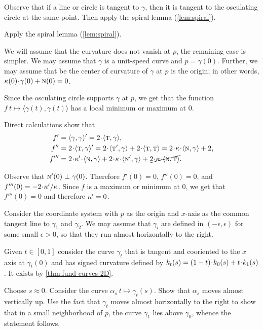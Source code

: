 Observe that if a line or circle is tangent to $\gamma$,
then it is tangent to the osculating circle at the same point.
Then apply the spiral lemma (\ref{lem:spiral}).

\setcounter{eqtn}{0}

Apply the spiral lemma (\ref{lem:spiral}).

We will assume that the curvature does not vanish at $p$, the remaining case is simpler.
We may assume that $\gamma$ is a unit-speed curve and $p=\gamma(0)$.
Further, we may assume that be the center of curvature of $\gamma$ at $p$ is the origin;
in other words, $\kur(0)\cdot\gamma(0)+ \norm(0)=0$.

Since the osculating circle supports $\gamma$ at $p$,
we get that the function $f\:t\mapsto \langle\gamma(t),\gamma(t)\rangle$ has a local minimum or maximum at $0$.

Direct calculations show that 
\begin{align*}
f'
&=\langle\gamma,\gamma\rangle'
=2\cdot\langle\tan,\gamma\rangle,
\\
f''
&=2\cdot\langle\tan,\gamma\rangle'
=2\cdot\langle\tan',\gamma\rangle+2\cdot\langle\tan,\tan\rangle
=2\cdot\kur\cdot\langle\norm,\gamma\rangle+2,
\\
f'''
&=2\cdot\kur'\cdot\langle\norm,\gamma\rangle
+2\cdot\kur\cdot\langle\norm',\gamma\rangle+\cancel{2\cdot\kur\cdot\langle\norm,\tan\rangle}.
\end{align*}

Observe that $\text{\sc{n}}'(0)\perp\gamma(0)$.
Therefore $f'(0)=0$, $f''(0)=0$, and $f'''(0)\z=-2\cdot\kur'/\kur$.
Since $f$ is a maximum or minimum at $0$, we get that $f'''(0)=0$ and therefore
$\kappa'=0$.

 Consider the coordinate system with $p$ as the origin and $x$-axis as the common tangent line to $\gamma_1$ and $\gamma_2$.
We may assume that $\gamma_i$ are defined in $(-\epsilon,\epsilon)$ for some small $\epsilon>0$,
so that they run almost horizontally to the right.

Given $t\in[0,1]$ consider the curve $\gamma_t$ that is tangent and cooriented to the $x$ axis at  $\gamma_t(0)$ and has signed curvature defined by $\skur_t(s)=(1\z-t)\cdot\skur_0(s)+t\cdot\skur_1(s)$.
It exists by \ref{thm:fund-curves-2D}.

Choose $s\approx 0$.
Consider the curve $\alpha_s\:t\mapsto \gamma_t(s)$.
Show that $\alpha_s$ moves almost vertically up.
Use the fact that $\gamma_t$ moves almost horizontally to the right to show that in a small neighborhood of $p$, the curve $\gamma_1$ lies above $\gamma_0$,
whence the statement follows.

